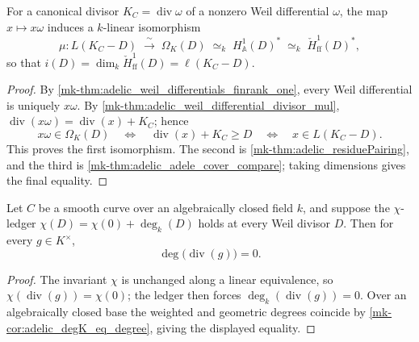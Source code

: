 \begin{theorem}
[Serre duality: \(i(D) = \ell(K_C - D)\)]
  \label{mk-thm:adelic_serreDuality}
  \notready
  For a canonical divisor \(K_C = \operatorname{div}\omega\) of a nonzero
  Weil differential \(\omega\), the map \(x \mapsto x\omega\) induces a
  \(k\)-linear isomorphism
  \[
    \mu \colon L(K_C - D) \;\xrightarrow{\ \sim\ }\; \Omega_K(D)
      \;\simeq_k\; H^1_{\mathbb A}(D)^*
      \;\simeq_k\;\check H^1_{\mathrm{ff}}(D)^*,
  \]
  so that \(i(D)=\dim_k\check H^1_{\mathrm{ff}}(D)=\ell(K_C-D)\).
\end{theorem}
\begin{proof}
  By \ref{mk-thm:adelic_weil_differentials_finrank_one}, every Weil
  differential is uniquely \(x\omega\).  By
  \ref{mk-thm:adelic_weil_differential_divisor_mul},
  \(\operatorname{div}(x\omega)=\operatorname{div}(x)+K_C\); hence
  \[
    x\omega\in\Omega_K(D)
      \quad\Longleftrightarrow\quad
    \operatorname{div}(x)+K_C\ge D
      \quad\Longleftrightarrow\quad x\in L(K_C-D).
  \]
  This proves the first isomorphism.  The second is
  \ref{mk-thm:adelic_residuePairing}, and the third is
  \ref{mk-thm:adelic_adele_cover_compare}; taking dimensions gives the final
  equality.
\end{proof}

\begin{theorem}
  \label{mk-thm:adelic_principal_geometric_degree_zero}
  \leanok
  Let \(C\) be a smooth curve over an algebraically closed field \(k\), and
  suppose the \(\chi\)-ledger
  \(\chi(D)=\chi(0)+\deg_k(D)\) holds at every Weil divisor \(D\). Then for
  every \(g\in K^\times\),
  \[
    \deg\bigl(\operatorname{div}(g)\bigr)=0 .
  \]
\end{theorem}
\begin{proof}
  \leanok
  The invariant \(\chi\) is unchanged along a linear equivalence, so
  \(\chi(\operatorname{div}(g))=\chi(0)\); the ledger then forces
  \(\deg_k(\operatorname{div}(g))=0\). Over an algebraically closed base the
  weighted and geometric degrees coincide by
  \ref{mk-cor:adelic_degK_eq_degree}, giving the displayed equality.
\end{proof}

